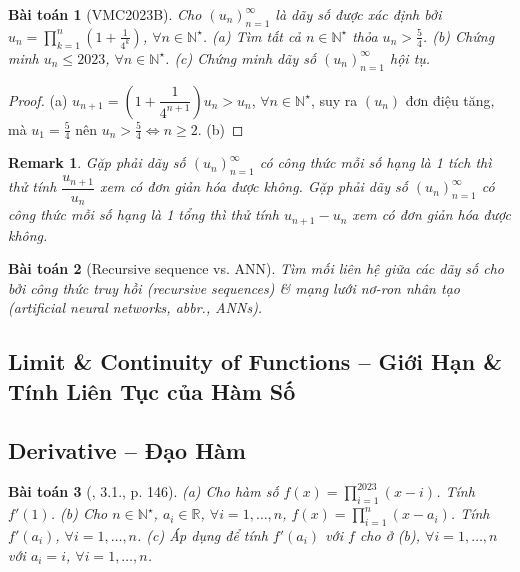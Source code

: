 \documentclass{article}
\newtheorem{baitoan}{Bài toán}
\newtheorem{remark}{Remark}
\begin{document}
\begin{baitoan}[VMC2023B]
	Cho $(u_n)_{n=1}^\infty$ là dãy số được xác định bởi $u_n = \prod_{k=1}^n \left(1 + \frac{1}{4^k}\right)$, $\forall n\in\mathbb{N}^\star$. (a) Tìm tất cả $n\in\mathbb{N}^\star$ thỏa $u_n > \frac{5}{4}$. (b) Chứng minh $u_n\le2023$, $\forall n\in\mathbb{N}^\star$. (c) Chứng minh dãy số $(u_n)_{n=1}^\infty$ hội tụ.
\end{baitoan}

\begin{proof}
	(a) $u_{n+1} = \left(1 + \dfrac{1}{4^{n+1}}\right)u_n > u_n$, $\forall n\in\mathbb{N}^\star$, suy ra $(u_n)$ đơn điệu tăng, mà $u_1 = \frac{5}{4}$ nên $u_n > \frac{5}{4}\Leftrightarrow n\ge2$. (b)
\end{proof}

\begin{remark}
	Gặp phải dãy số $(u_n)_{n=1}^\infty$ có công thức mỗi số hạng là 1 tích thì thử tính $\dfrac{u_{n+1}}{u_n}$ xem có đơn giản hóa được không. Gặp phải dãy số $(u_n)_{n=1}^\infty$ có công thức mỗi số hạng là 1 tổng thì thử tính $u_{n+1} - u_n$ xem có đơn giản hóa được không.
\end{remark}

\begin{baitoan}[Recursive sequence vs. ANN]
	Tìm mối liên hệ giữa các dãy số cho bởi công thức truy hồi (recursive sequences) \& mạng lưới nơ-ron nhân tạo (artificial neural networks, abbr., ANNs).
\end{baitoan}


\subsection{Limit \& Continuity of Functions -- Giới Hạn \& Tính Liên Tục của Hàm Số}


\subsection{Derivative -- Đạo Hàm}

\begin{baitoan}[\cite{Quoc_Long_Dat_Nam_VMC}, 3.1., p. 146]
	(a) Cho hàm số $f(x) = \prod_{i=1}^{2023} (x - i)$. Tính $f'(1)$. (b) Cho $n\in\mathbb{N}^\star$, $a_i\in\mathbb{R}$, $\forall i = 1,\ldots,n$, $f(x) = \prod_{i=1}^n (x - a_i)$. Tính $f'(a_i)$, $\forall i = 1,\ldots,n$. (c) Áp dụng để tính $f'(a_i)$ với $f$ cho ở (b), $\forall i = 1,\ldots,n$ với $a_i = i$, $\forall i = 1,\ldots,n$.
\end{baitoan}
\end{document}
